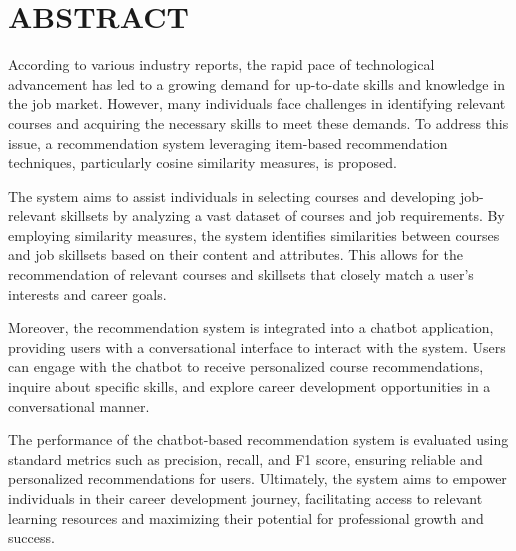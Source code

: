 \chapter*{\uppercase{ABSTRACT}}
According to various industry reports, the rapid pace of technological advancement has led to a growing demand for up-to-date skills and knowledge in the job market. However, many individuals face challenges in identifying relevant courses and acquiring the necessary skills to meet these demands. To address this issue, a recommendation system leveraging item-based recommendation techniques, particularly cosine similarity measures, is proposed.

The system aims to assist individuals in selecting courses and developing job-relevant skillsets by analyzing a vast dataset of courses and job requirements. By employing similarity measures, the system identifies similarities between courses and job skillsets based on their content and attributes. This allows for the recommendation of relevant courses and skillsets that closely match a user's interests and career goals.

Moreover, the recommendation system is integrated into a chatbot application, providing users with a conversational interface to interact with the system. Users can engage with the chatbot to receive personalized course recommendations, inquire about specific skills, and explore career development opportunities in a conversational manner.

The performance of the chatbot-based recommendation system is evaluated using standard metrics such as precision, recall, and F1 score, ensuring reliable and personalized recommendations for users. Ultimately, the system aims to empower individuals in their career development journey, facilitating access to relevant learning resources and maximizing their potential for professional growth and success.